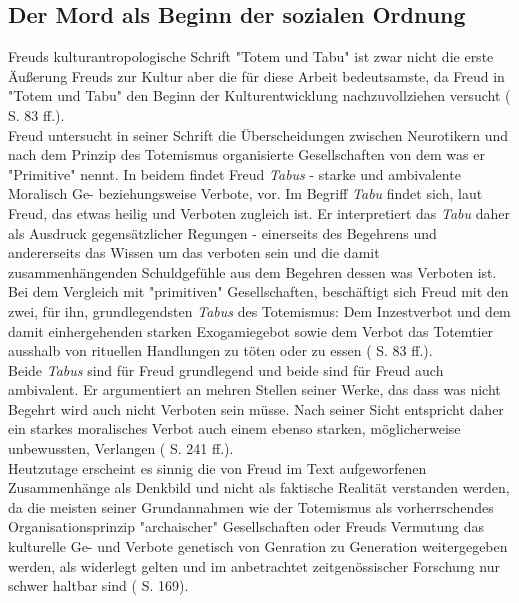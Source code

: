 \documentclass[11pt,a4paper,oneside,numbers=noenddot,bibliography=totocnumbered,DIV=13]{scrartcl}
\begin{document}
\subsection{Der Mord als Beginn der sozialen Ordnung} 
Freuds kulturantropologische Schrift "Totem und Tabu" ist zwar nicht die erste Äußerung Freuds zur Kultur aber die für diese Arbeit bedeutsamste, da Freud in "Totem und Tabu" den Beginn der Kulturentwicklung nachzuvollziehen versucht ({\cite{berkel_sigmund_2008} S. 83 ff.). \\
Freud untersucht in seiner Schrift die Überscheidungen zwischen \glqq Neurotikern \grqq und nach dem Prinzip des Totemismus organisierte Gesellschaften von dem was er "Primitive" nennt. In beidem findet Freud \textit{Tabus} - starke und ambivalente Moralisch Ge- beziehungsweise Verbote, vor. Im Begriff \textit{Tabu} findet sich, laut Freud, das etwas heilig und Verboten zugleich ist. Er interpretiert das \textit{Tabu} daher als Ausdruck gegensätzlicher Regungen - einerseits des Begehrens und andererseits das Wissen um das verboten sein und die damit zusammenhängenden Schuldgefühle aus dem Begehren dessen was Verboten ist. Bei dem Vergleich mit "primitiven" Gesellschaften, beschäftigt sich Freud mit den zwei, für ihn, grundlegendsten \textit{Tabus} des Totemismus: Dem Inzestverbot und dem damit einhergehenden starken Exogamiegebot sowie dem Verbot das Totemtier ausshalb von rituellen Handlungen zu töten oder zu essen (\cite{berkel_sigmund_2008} S. 83 ff.).\\
Beide \textit{Tabus} sind für Freud grundlegend und beide sind für Freud auch ambivalent. Er argumentiert an mehren Stellen seiner Werke, das dass was nicht Begehrt wird auch nicht Verboten sein müsse. Nach seiner Sicht entspricht daher ein starkes moralisches Verbot auch einem ebenso starken, möglicherweise unbewussten, Verlangen (\cite{lohmann_freud-handbuch:_2013} S. 241 ff.).\\
Heutzutage erscheint es sinnig  die von Freud im Text aufgeworfenen Zusammenhänge als Denkbild und nicht als faktische Realität verstanden werden, da die meisten seiner Grundannahmen wie der Totemismus als vorherrschendes Organisationsprinzip "archaischer" Gesellschaften oder Freuds Vermutung das  kulturelle Ge- und Verbote genetisch von Genration zu Generation weitergegeben werden, als widerlegt gelten und im anbetrachtet zeitgenössischer Forschung nur schwer haltbar sind (\cite{lohmann_freud-handbuch:_2013} S. 169).\\
}
\end{document}
